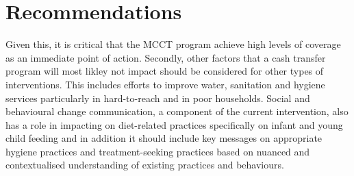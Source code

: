 \documentclass[12pt,a4paper]{article}
\begin{document}
\hypertarget{recommendations}{%
\section{Recommendations}\label{recommendations}}

Given this, it is critical that the MCCT program achieve high levels of coverage as an immediate point of action. Secondly, other factors that a cash transfer program will most likley not impact should be considered for other types of interventions. This includes efforts to improve water, sanitation and hygiene services particularly in hard-to-reach and in poor households. Social and behavioural change communication, a component of the current intervention, also has a role in impacting on diet-related practices specifically on infant and young child feeding and in addition it should include key messages on appropriate hygiene practices and treatment-seeking practices based on nuanced and contextualised understanding of existing practices and behaviours.


\end{document}
